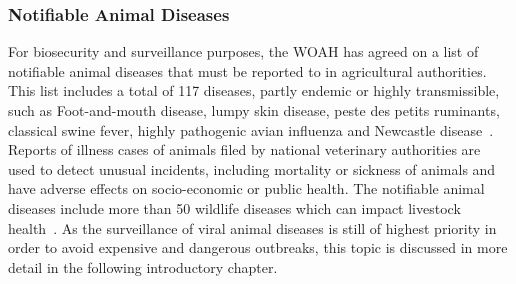 \subsubsection*{Notifiable Animal Diseases}
For biosecurity and surveillance purposes, the \ac{WOAH} has agreed on a list of notifiable animal diseases that must be reported to in agricultural authorities. This list includes a total of 117 diseases, partly endemic or highly transmissible, such as Foot-and-mouth disease, lumpy skin disease, peste des petits ruminants, classical swine fever, highly pathogenic avian influenza and Newcastle disease~\cite{woah2023list}. \\ %
Reports of illness cases of animals filed by national veterinary authorities are used to detect unusual incidents, including mortality or sickness of animals and have adverse effects on socio-economic or public health. The notifiable animal diseases include more than 50 wildlife diseases which can impact livestock health~\cite{woah2023list}. As the surveillance of viral animal diseases is still of highest priority in order to avoid expensive and dangerous outbreaks, this topic is discussed in more detail in the following introductory chapter.


